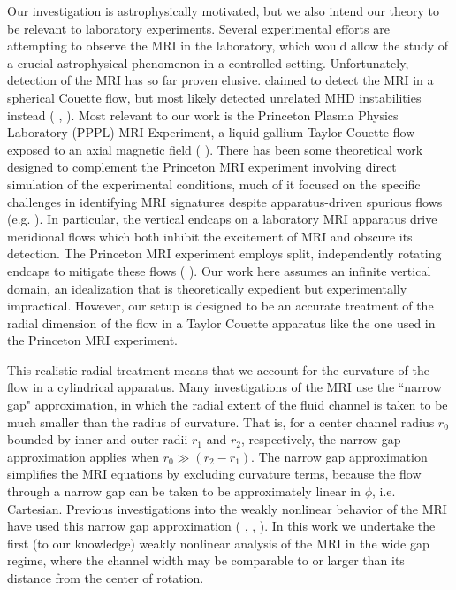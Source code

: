 \documentclass{emulateapj}
\newcommand{\citei}[1]{\citeauthor{#1} \citeyear{#1}}
\begin{document}
Our investigation is astrophysically motivated, but we also intend our theory to be relevant to laboratory experiments. Several experimental efforts are attempting to observe the MRI in the laboratory, which would allow the study of a crucial astrophysical phenomenon in a controlled setting. Unfortunately, detection of the MRI has so far proven elusive. \citei{Sisan:2004ig} claimed to detect the MRI in a spherical Couette flow, but most likely detected unrelated MHD instabilities instead (\citei{Hollerbach:2009ig}, \citei{Gissinger:2011td}). Most relevant to our work is the Princeton Plasma Physics Laboratory (PPPL) MRI Experiment, a liquid gallium Taylor-Couette flow exposed to an axial magnetic field (\citei{Ji:2001kd}). There has been some theoretical work designed to complement the Princeton MRI experiment involving direct simulation of the experimental conditions, much of it focused on the specific challenges in identifying MRI signatures despite apparatus-driven spurious flows (e.g. \citei{Gissinger:2012gc}). In particular, the vertical endcaps on a laboratory MRI apparatus drive meridional flows which both inhibit the excitement of MRI and obscure its detection. The Princeton MRI experiment employs split, independently rotating endcaps to mitigate these flows (\citei{Schartman:2009df}). Our work here assumes an infinite vertical domain, an idealization that is theoretically expedient but experimentally impractical. However, our setup is designed to be an accurate treatment of the radial dimension of the flow in a Taylor Couette apparatus like the one used in the Princeton MRI experiment. 

This realistic radial treatment means that we account for the curvature of the flow in a cylindrical apparatus. Many investigations of the MRI use the ``narrow gap" approximation, in which the radial extent of the fluid channel is taken to be much smaller than the radius of curvature. That is, for a center channel radius $r_0$ bounded by inner and outer radii $r_1$ and $r_2$, respectively, the narrow gap approximation applies when $r_0 \gg (r_2 - r_1)$. The narrow gap approximation simplifies the MRI equations by excluding curvature terms, because the flow through a narrow gap can be taken to be approximately linear in $\phi$, i.e. Cartesian. Previous investigations into the weakly nonlinear behavior of the MRI have used this narrow gap approximation (\citei{Umurhan:2007dz}, \citei{Umurhan:2007hs}, \citei{Clark:2016}). In this work we undertake the first (to our knowledge) weakly nonlinear analysis of the MRI in the wide gap regime, where the channel width may be comparable to or larger than its distance from the center of rotation.
\end{document}
